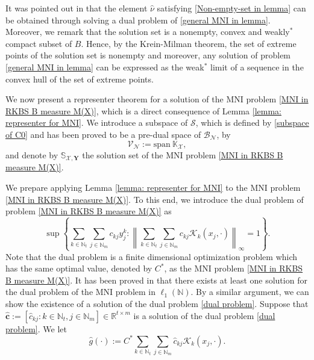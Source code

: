 \documentclass[11pt]{article}
\begin{document}
It was pointed out in \cite{wang2023sparse} that the element $\hat\nu$ satisfying \eqref{Non-empty-set in lemma} can be obtained through solving a dual problem of \eqref{general MNI in lemma}. Moreover, we remark that the solution set
is a nonempty, convex and weakly$^*$ compact subset of $B$. Hence, by the Krein-Milman theorem, the set of extreme points of the solution set is nonempty and moreover, any solution of problem \eqref{general MNI in lemma} can be expressed as the weak$^*$ limit of a sequence in the convex hull of the set of extreme points. 

We now present a representer theorem for a solution of the MNI problem \eqref{MNI in RKBS B measure M(X)}, which is a direct consequence of Lemma \ref{lemma: representer for MNI}. We introduce a subspace of $\mathcal{S}$, which is defined by \eqref{subspace of C0} and has been proved to be a pre-dual space of $\mathcal{B}_{\mathcal{N}}$, by
\begin{equation}\label{V_span_kernel}
\mathcal{V}_{\mathcal{N}}:=\mathrm{span}\ \mathbb{K}_\mathcal{X},
\end{equation}
and denote by $\mathbb{S}_{\mathcal{X},\mathbf{Y}}$ the solution set of the MNI problem \eqref{MNI in RKBS B measure M(X)}. 


We prepare applying Lemma \ref{lemma: representer for MNI} to the MNI problem \eqref{MNI in RKBS B measure M(X)}. %
To this end, we introduce the dual problem of problem \eqref{MNI in RKBS B measure M(X)} as 
\begin{equation}\label{dual problem}
    \sup\left\{ \sum_{k\in\mathbb{N}_t}\sum_{j\in\mathbb{N}_m}c_{kj}y_j^k:\left\|\sum_{k\in\mathbb{N}_t}\sum_{j\in\mathbb{N}_m} c_{kj}\mathcal{K}_k(x_j,\cdot)\right\|_{\infty}=1\right\}.
\end{equation}
Note that the dual problem is a finite dimensional optimization problem which has the same optimal value, denoted by ${C^*}$, as the MNI problem \eqref{MNI in RKBS B measure M(X)}. It has been proved in \cite{cheng2021minimum} that there exists at least one solution for the dual problem of the MNI problem in $\ell_1(\mathbb{N})$. By a similar argument, we can show the existence of a solution of the dual problem \eqref{dual problem}. Suppose that $\hat{\mathbf{c}}:=[\hat{c}_{kj}:k\in\mathbb{N}_t,j\in\mathbb{N}_m]\in\mathbb{R}^{t\times m}$ is a solution of the dual problem \eqref{dual problem}. We let
\begin{equation}\label{stage 1 hat g}
    \hat{g}(\cdot):={C^*}\sum_{k\in\mathbb{N}_t}\sum_{j\in\mathbb{N}_m}\hat{c}_{kj}\mathcal{K}_k(x_j,\cdot). 
\end{equation}
\end{document}
